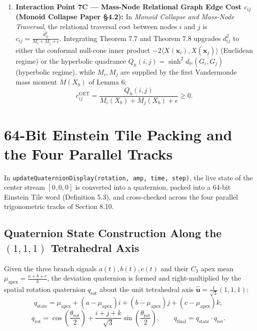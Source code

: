 \documentclass[11pt, a4paper]{article}
\begin{document}
\begin{enumerate}
    where $\langle G(\mathbf{p}), G(\mathbf{r})\rangle_L = \frac{(1+|\mathbf{p}|^2)(1+|\mathbf{r}|^2) - 4\mathbf{p}\cdot\mathbf{r}}{(1-|\mathbf{p}|^2)(1-|\mathbf{r}|^2)}$. This replaces transcendental $\operatorname{arccosh}$ and $\sinh$ evaluations with a single rational fraction!
    \item \textbf{Interaction Point 7C — Mass-Node Relational Graph Edge Cost $c_{ij}$ (Monoid Collapse Paper §4.2):}
    In \textit{Monoid Collapse and Mass-Node Traversal}, the relational traversal cost between nodes $i$ and $j$ is $c_{ij} = \frac{d_{ij}^2}{M_i + M_j + \epsilon}$. Integrating Theorem 7.7 and Theorem 7.8 upgrades $d_{ij}^2$ to either the conformal null-cone inner product $-2\langle X(\mathbf{x}_i), X(\mathbf{x}_j)\rangle$ (Euclidean regime) or the hyperbolic quadrance $Q_h(i,j) = \sinh^2 d_{\mathbb{H}}(G_i, G_j)$ (hyperbolic regime), while $M_i, M_j$ are supplied by the first Vandermonde mass moment $M(X_b)$ of Lemma 6:
    \begin{equation}
    c_{ij}^{\text{GET}} = \frac{Q_h(i, j)}{M_i(X_b) + M_j(X_b) + \epsilon} \ge 0.
    \end{equation}
\end{enumerate}

\section{64-Bit Einstein Tile Packing and the Four Parallel Tracks}

In \texttt{updateQuaternionDisplay(rotation, amp, time, step)}, the live state of the center stream $[0,0,0]$ is converted into a quaternion, packed into a 64-bit Einstein Tile word (Definition 5.3), and cross-checked across the four parallel trigonometric tracks of Section 8.10.

\subsection{Quaternion State Construction Along the \texorpdfstring{$(1,1,1)$}{(1,1,1)} Tetrahedral Axis}
Given the three branch signals $a(t), b(t), c(t)$ and their $C_3$ apex mean $\mu_{\text{apex}} = \frac{a+b+c}{3}$, the deviation quaternion is formed and right-multiplied by the spatial rotation quaternion $q_{\text{rot}}$ about the unit tetrahedral axis $\hat{\mathbf{u}} = \frac{1}{\sqrt{3}}(1,1,1)$:
\begin{equation}
q_{\text{state}} = \mu_{\text{apex}} + (a - \mu_{\text{apex}})i + (b - \mu_{\text{apex}})j + (c - \mu_{\text{apex}})k,
\end{equation}
\begin{equation}
q_{\text{rot}} = \cos\!\left(\frac{\theta_{\text{rot}}}{2}\right) + \frac{i+j+k}{\sqrt{3}}\sin\!\left(\frac{\theta_{\text{rot}}}{2}\right), \qquad q_{\text{final}} = q_{\text{state}} \cdot q_{\text{rot}}.
\end{equation}
\end{document}
